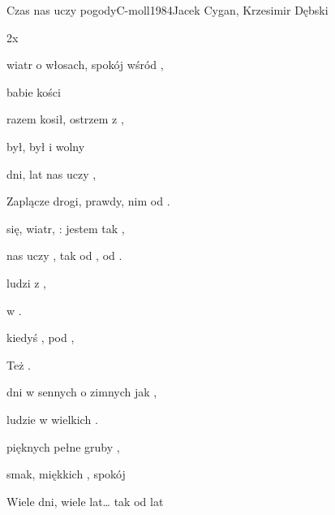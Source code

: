 \begin{song}{Czas nas uczy pogody}{C-moll}{1984}{Jacek Cygan, Krzesimir Dębski}{}{}

  \begin{SBBracket}{2x}
     
  \end{SBBracket}

  \begin{SBVerse}
     wiatr o  włosach,  spokój wśród ,

     babie  kości 

     razem  kosił,  ostrzem z ,

     był,  był i   wolny 
  \end{SBVerse}

  \begin{SBChorus}
     dni,  lat  nas uczy ,

    Zaplącze drogi,  prawdy, nim   od .

     się,  wiatr, : jestem tak ,

     nas uczy , tak od ,   od .  
  \end{SBChorus}

  \begin{SBChorus}
     ludzi   z ,

     w   .  

     kiedyś , pod  ,

    Też      .  
  \end{SBChorus}

  \begin{SBVerse}
     dni w  sennych o  zimnych jak ,

     ludzie w  wielkich .

     pięknych  pełne  gruby ,

     smak,  miękkich ,  spokój 
  \end{SBVerse}

  \begin{SBChorus}
    Wiele dni, wiele lat… tak od lat
  \end{SBChorus}

\end{song}
